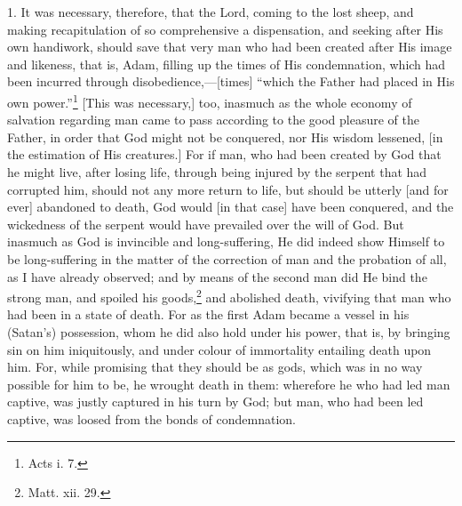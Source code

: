 
1. It was necessary, therefore, that the Lord, coming to the lost sheep, and making recapitulation of so comprehensive a dispensation, and seeking after His own handiwork, should save that very man who had been created after His image and likeness, that is, Adam, filling up the times of His condemnation, which had been incurred through disobedience,—[times] “which the Father had placed in His own power.”\footnote{Acts i. 7.} [This was necessary,] too, inasmuch as the whole economy of salvation regarding man came to pass according to the good pleasure of the Father, in order that God might not be conquered, nor His wisdom lessened, [in the estimation of His creatures.] For if man, who had been created by God that he might live, after losing life, through being injured by the serpent that had corrupted him, should not any more return to life, but should be utterly [and for ever] abandoned to death, God would [in that case] have been conquered, and the wickedness of the serpent would have prevailed over the will of God. But inasmuch as God is invincible and long-suffering, He did indeed show Himself to be long-suffering in the matter of the correction of man and the probation of all, as I have already  observed; and by means of the second man did He bind the strong man, and spoiled his goods,\footnote{Matt. xii. 29.} and abolished death, vivifying that man who had been in a state of death. For as the first Adam became a vessel in his (Satan’s) possession, whom he did also hold under his power, that is, by bringing sin on him iniquitously, and under colour of immortality entailing death upon him. For, while promising that they should be as gods, which was in no way possible for him to be, he wrought death in them: wherefore he who had led man captive, was justly captured in his turn by God; but man, who had been led captive, was loosed from the bonds of condemnation.

